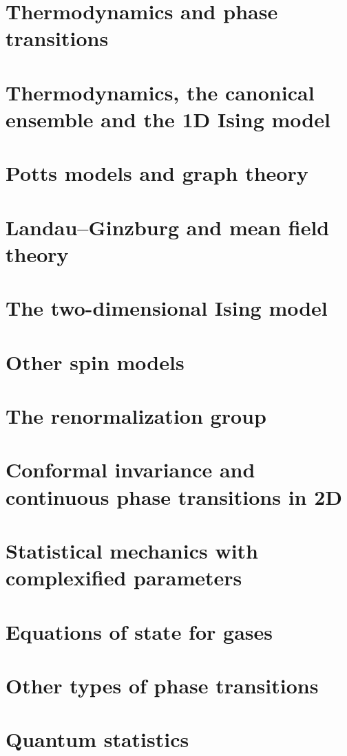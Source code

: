 \section{Thermodynamics and phase transitions}




\section{Thermodynamics, the canonical ensemble and the 1D Ising model}




\section{Potts models and graph theory}




\section{Landau--Ginzburg and mean field theory}



\section{The two-dimensional Ising model}

\section{Other spin models}

\section{The renormalization group}





\section{Conformal invariance and continuous phase transitions in 2D}

\section{Statistical mechanics with complexified parameters}


\section{Equations of state for gases}





\section{Other types of phase transitions}


\section{Quantum statistics}


\appendix

